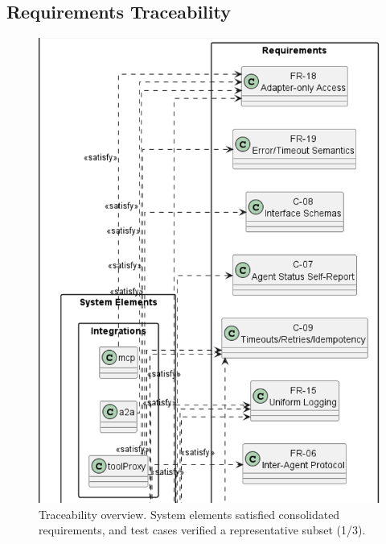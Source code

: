 \subsection{Requirements Traceability}\label{app:trace}
\begin{figure}[htbp]
  \centering
  \includegraphics[width=0.7\linewidth]{ressources/MAS/diagrams/MASTraceability1.png}
  \caption{Traceability overview. System elements satisfied consolidated requirements, and test cases verified a representative subset (1/3).}
  \label{fig:app-mas-traceability}
\end{figure}

\clearpage
